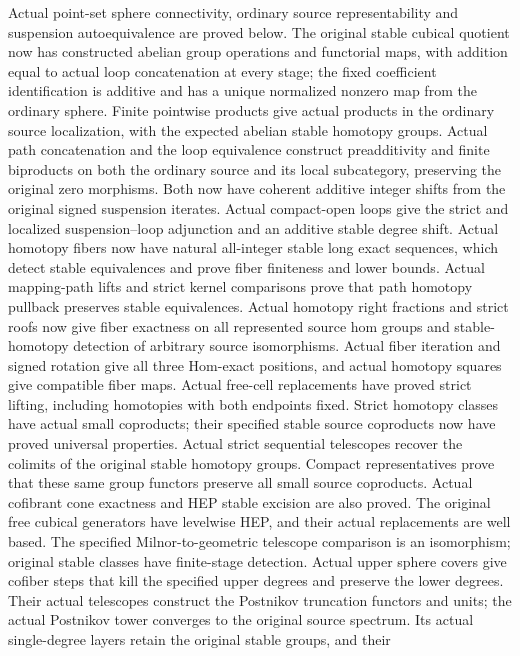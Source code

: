 Actual point-set sphere connectivity, ordinary source representability and
suspension autoequivalence are proved below. The original stable cubical quotient now has constructed abelian
group operations and functorial maps, with addition equal to actual loop
concatenation at every stage; the fixed coefficient identification is additive and has a unique normalized
nonzero map from the ordinary sphere. Finite pointwise products give actual
products in the ordinary source localization, with the expected abelian stable
homotopy groups. Actual path concatenation and the loop equivalence construct
preadditivity and finite biproducts on both the ordinary source and its local
subcategory, preserving the original zero morphisms. Both now have coherent
additive integer shifts from the original signed suspension iterates. Actual compact-open loops give the strict and
localized suspension--loop adjunction and an additive stable degree shift.
Actual homotopy fibers now have natural all-integer stable long exact sequences,
which detect stable equivalences and prove fiber finiteness and lower bounds.
Actual mapping-path lifts and strict kernel comparisons prove that path
homotopy pullback preserves stable equivalences. Actual homotopy right fractions
and strict roofs now give fiber exactness on all represented source hom groups
and stable-homotopy detection of arbitrary source isomorphisms. Actual fiber
iteration and signed rotation give all three Hom-exact positions, and actual
homotopy squares give compatible fiber maps. Actual free-cell replacements have proved strict lifting, including homotopies
with both endpoints fixed. Strict homotopy classes have actual small coproducts;
their specified stable source coproducts now have proved universal properties.
Actual strict sequential telescopes recover the colimits of the original
stable homotopy groups. Compact representatives prove that these same group
functors preserve all small source coproducts. Actual cofibrant cone exactness
and HEP stable excision are also proved. The original free cubical generators
have levelwise HEP, and their actual replacements are well based. The specified
Milnor-to-geometric telescope comparison is an isomorphism; original stable
classes have finite-stage detection. Actual upper sphere covers give cofiber
steps that kill the specified upper degrees and preserve the lower degrees.
Their actual telescopes construct the Postnikov truncation functors and units;
the actual Postnikov tower converges to the original source spectrum. Its
actual single-degree layers retain the original stable groups, and their
